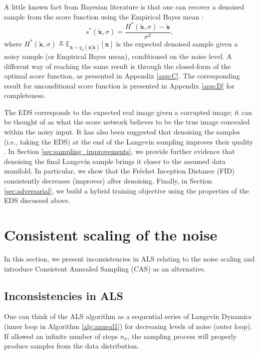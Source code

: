 \documentclass{article} \usepackage{iclr2021_conference_notitle,times}
\theoremstyle{definition}
\theoremstyle{definition}
\begin{document}
A little known fact from Bayesian literature is that one can recover a denoised sample from the score function using the Empirical Bayes mean \citep{robbins1955empirical,miyasawa1961empirical, raphan2011least}:
\begin{equation}\label{eqn:eds}s^{*}(\boldsymbol{\tilde{x}},\sigma) = \frac{H^*(\boldsymbol{\tilde{x}},\sigma) - \boldsymbol{\tilde{x}}}{\sigma^2},\end{equation}
where $H^*(\boldsymbol{\tilde{x}},\sigma) \triangleq \mathbb{E}_{\boldsymbol{x} \sim q_\sigma(\boldsymbol{x} | \boldsymbol{\tilde{x}})}[\boldsymbol{x}]$ is the expected denoised sample given a noisy sample (or Empirical Bayes mean), conditioned on the noise level. A different way of reaching the same result is through the closed-form of the optimal score function, as presented in Appendix \ref{app:C}. The corresponding result for unconditional score function is presented in Appendix \ref{app:D} for completeness.

The EDS corresponds to the expected real image given a corrupted image; it can be thought of as what the score network believes to be the true image concealed within the noisy input. It has also been suggested that denoising the samples (i.e., taking the EDS) at the end of the Langevin sampling improves their quality \citep{saremi2019neural, li2019learning, kadkhodaie2020solving}. In Section \ref{sec:sampling_improvements}, we provide further evidence that denoising the final Langevin sample brings it closer to the assumed data manifold. In particular, we show that the Fréchet Inception Distance (FID) consistently decreases (improves) after denoising. Finally, in Section \ref{sec:adversarial}, we build a hybrid training objective using the properties of the EDS discussed above.


\section{Consistent scaling of the noise}\label{sec:consistent}

In this section, we present inconsistencies in ALS relating to the noise scaling and introduce Consistent Annealed Sampling (CAS) as an alternative.


\subsection{Inconsistencies in ALS}

One can think of the ALS algorithm as a sequential series of Langevin Dynamics (inner loop in Algorithm \ref{alg:anneal1}) for decreasing levels of noise (outer loop). If allowed an infinite number of steps $n_\sigma$, the sampling process will properly produce samples from the data distribution. 
\end{document}
